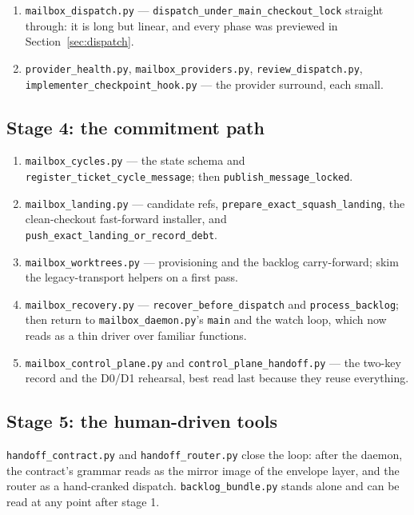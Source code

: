 \documentclass[10pt,aps,prd,twocolumn,nofootinbib]{revtex4-2}
\newcommand{\code}[1]{\texttt{#1}}
\newcommand{\file}[1]{\texttt{#1}}
\begin{document}
\begin{enumerate}
  \item \file{mailbox\_dispatch.py} ---
  \code{dispatch\_under\_main\_checkout\_lock} straight through: it is
  long but linear, and every phase was previewed in
  Section~\ref{sec:dispatch}.
  \item \file{provider\_health.py}, \file{mailbox\_providers.py},
  \file{review\_dispatch.py}, \file{implementer\_checkpoint\_hook.py}
  --- the provider surround, each small.
\end{enumerate}

\subsection{Stage 4: the commitment path}

\begin{enumerate}
  \item \file{mailbox\_cycles.py} --- the state schema and
  \code{register\_ticket\_cycle\_message}; then
  \code{publish\_message\_locked}.
  \item \file{mailbox\_landing.py} --- candidate refs,
  \code{prepare\_exact\_squash\_landing}, the clean-checkout
  fast-forward installer, and
  \code{push\_exact\_landing\_or\_record\_debt}.
  \item \file{mailbox\_worktrees.py} --- provisioning and the backlog
  carry-forward; skim the legacy-transport helpers on a first pass.
  \item \file{mailbox\_recovery.py} --- \code{recover\_before\_dispatch}
  and \code{process\_backlog}; then return to
  \file{mailbox\_daemon.py}'s \code{main} and the watch loop, which
  now reads as a thin driver over familiar functions.
  \item \file{mailbox\_control\_plane.py} and
  \file{control\_plane\_handoff.py} --- the two-key record and the
  D0/D1 rehearsal, best read last because they reuse everything.
\end{enumerate}

\subsection{Stage 5: the human-driven tools}

\file{handoff\_contract.py} and \file{handoff\_router.py} close the
loop: after the daemon, the contract's grammar reads as the mirror
image of the envelope layer, and the router as a hand-cranked
dispatch.  \file{backlog\_bundle.py} stands alone and can be read at
any point after stage 1.
\end{document}
